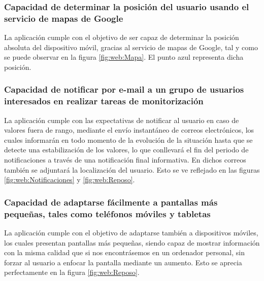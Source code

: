 \subsubsection{Capacidad de determinar la posición del usuario usando el servicio de mapas de Google}
	La aplicación cumple con el objetivo de ser capaz de determinar la posición absoluta del dispositivo móvil, gracias al servicio de mapas de Google, tal y como se puede observar en la figura \ref{fig:web:Mapa}. El punto azul representa dicha posición.
	
\subsubsection{Capacidad de notificar por e-mail a un grupo de usuarios interesados en realizar tareas de monitorización}
	La aplicación cumple con las expectativas de notificar al usuario en caso de valores fuera de rango, mediante el envío instantáneo de correos electrónicos, los cuales informarán en todo momento de la evolución de la situación hasta que se detecte una estabilización de los valores, lo que conllevará el fin del periodo de notificaciones a través de una notificación final informativa. En dichos correos también se adjuntará la localización del usuario. Esto se ve reflejado en las figuras \ref{fig:web:Notificaciones} y \ref{fig:web:Reposo}.

\subsubsection{Capacidad de adaptarse fácilmente a pantallas más pequeñas, tales como teléfonos móviles y tabletas}
	La aplicación cumple con el objetivo de adaptarse también a dispositivos móviles, los cuales presentan pantallas más pequeñas, siendo capaz de mostrar información con la misma calidad que si nos encontrásemos en un ordenador personal, sin forzar al usuario a enfocar la pantalla mediante un aumento. Esto se aprecia perfectamente en la figura \ref{fig:web:Reposo}.
	
\chapterend{}